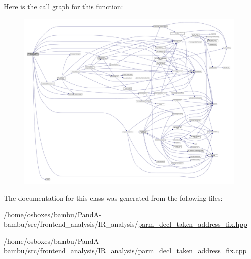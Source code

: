 Here is the call graph for this function\+:
\nopagebreak
\begin{figure}[H]
\begin{center}
\leavevmode
\includegraphics[width=350pt]{dc/dfd/classparm__decl__taken__address__fix_afeaf66df2e6c884ca04ae5410298d052_cgraph}
\end{center}
\end{figure}


The documentation for this class was generated from the following files\+:\begin{DoxyCompactItemize}
\item 
/home/osboxes/bambu/\+Pand\+A-\/bambu/src/frontend\+\_\+analysis/\+I\+R\+\_\+analysis/\hyperlink{parm__decl__taken__address__fix_8hpp}{parm\+\_\+decl\+\_\+taken\+\_\+address\+\_\+fix.\+hpp}\item 
/home/osboxes/bambu/\+Pand\+A-\/bambu/src/frontend\+\_\+analysis/\+I\+R\+\_\+analysis/\hyperlink{parm__decl__taken__address__fix_8cpp}{parm\+\_\+decl\+\_\+taken\+\_\+address\+\_\+fix.\+cpp}\end{DoxyCompactItemize}
